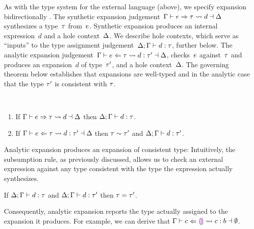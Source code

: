 As with the type system for the external language (above), 
we specify expansion bidirectionally \cite{DBLP:conf/ppdp/FerreiraP14}.
%
The synthetic expansion judgement~$\Gamma \vdash e \Rightarrow \tau \leadsto d \dashv \Delta$ synthesizes a type~$\tau$ from~$e$.
%
Synthetic expansion produces an internal expression~$d$ and a hole context~$\Delta$.
%
We describe hole contexts, which serve as ``inputs'' to the type assignment judgement~$\Delta; \Gamma \vdash d : \tau$, further below. 
%
The analytic expansion judgement~$\Gamma \vdash e \Leftarrow \tau \leadsto d : \tau' \dashv \Delta$, checks~$e$ against~$\tau$ and produces an expansion~$d$ of type~$\tau'$, and a hole context~$\Delta$.
%
The governing theorem below establishes that expansions are well-typed and in the analytic case that the type $\tau'$ is consistent with $\tau$.
%
\begin{thm}\label{thm:typed-expansion} ~
  \begin{enumerate}[nolistsep]
    \item
      If $\Gamma \vdash e \Rightarrow \tau \leadsto d \dashv \Delta$
      then $\Delta; \Gamma \vdash d : \tau$.
    \item
      If $\Gamma \vdash e \Leftarrow \tau \leadsto d : \tau' \dashv \Delta$
      then $\tau \sim \tau'$ and $\Delta; \Gamma \vdash d : \tau'$.
  \end{enumerate}
\end{thm}
\noindent

%
Analytic expansion produces an expansion of consistent type:
%
Intuitively, the subsumption rule, as previously discussed, allows us
to check an external expression against any type consistent with the
type the expression actually synthesizes.


\begin{thm}
  If $\Delta; \Gamma \vdash d : \tau$
  and $\Delta; \Gamma \vdash d : \tau'$
  then $\tau=\tau'$.
\end{thm}
\noindent
Consequently, analytic expansion reports the type actually assigned to the expansion it produces.
%
For example, we can derive that $\Gamma \vdash c \Leftarrow \textcolor{violet}{\llparenthesis}\textcolor{violet}{\rrparenthesis} \leadsto c : b \dashv \emptyset$.%

